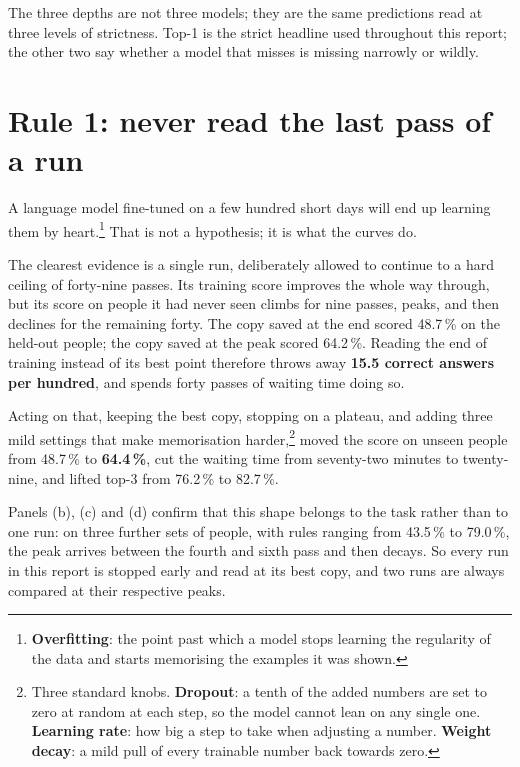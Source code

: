 

The three depths are not three models; they are the same predictions read at
three levels of strictness. Top-1 is the strict headline used throughout this
report; the other two say whether a model that misses is missing narrowly or
wildly.

\section{Rule 1: never read the last pass of a run}

A language model fine-tuned on a few hundred short days will end up learning them
by heart.\footnote{\textbf{Overfitting}: the point past which a model stops
learning the regularity of the data and starts memorising the examples it was
shown.} That is not a hypothesis; it is what the curves do.



The clearest evidence is a single run, deliberately allowed to continue to a hard
ceiling of forty-nine passes. Its training score improves the whole way through,
but its score on people it had never seen climbs for nine passes, peaks, and then
declines for the remaining forty. The copy saved at the end scored 48.7\,\% on
the held-out people; the copy saved at the peak scored 64.2\,\%. Reading the end
of training instead of its best point therefore throws away \textbf{15.5 correct
answers per hundred}, and spends forty passes of waiting time doing so.

Acting on that, keeping the best copy, stopping on a plateau, and adding three
mild settings that make memorisation harder,\footnote{Three standard knobs.
\textbf{Dropout}: a tenth of the added numbers are set to zero at random at each
step, so the model cannot lean on any single one. \textbf{Learning rate}: how big
a step to take when adjusting a number. \textbf{Weight decay}: a mild pull of
every trainable number back towards zero.} moved the score on unseen people from
48.7\,\% to \textbf{64.4\,\%}, cut the waiting time from seventy-two minutes to
twenty-nine, and lifted top-3 from 76.2\,\% to 82.7\,\%.

Panels (b), (c) and (d) confirm that this shape belongs to the task rather than
to one run: on three further sets of people, with rules ranging from 43.5\,\% to
79.0\,\%, the peak arrives between the fourth and sixth pass and then decays. So
every run in this report is stopped early and read at its best copy, and two runs
are always compared at their respective peaks.

